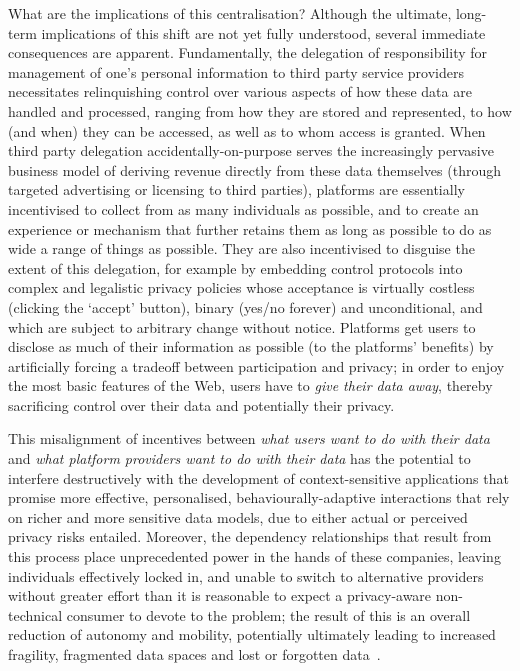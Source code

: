 \documentclass[graybox]{svmult}
\begin{document}
What are the implications of this centralisation?  Although the ultimate, long-term implications of this shift are not yet fully understood, several immediate consequences are apparent. Fundamentally, the delegation of responsibility for management of one's personal information to third party service providers necessitates relinquishing control over various aspects of how these data are handled and processed, ranging from how they are stored and represented, to how (and when) they can be accessed, as well as to whom access is granted.  When third party delegation accidentally-on-purpose serves the increasingly pervasive business model of deriving revenue directly from these data themselves (through targeted advertising or licensing to third parties), platforms are essentially incentivised to collect from as many individuals as possible, and to create an experience or mechanism that further retains them as long as possible to do as wide a range of things as possible. They are also incentivised to disguise the extent of this delegation, for example by embedding control protocols into complex and legalistic privacy policies whose acceptance is virtually costless (clicking the `accept' button), binary (yes/no forever) and unconditional, and which are subject to arbitrary change without notice. Platforms get users to disclose as much of their information as possible (to the platforms' benefits) by artificially forcing a tradeoff between participation and privacy; in order to enjoy the most basic features of the Web, users have to \emph{give their data away}, thereby sacrificing control over their data and potentially their privacy.

This misalignment of incentives between \emph{what users want to do with their data} and \emph{what platform providers want to do with their data} has the potential to interfere destructively with the development of context-sensitive applications that promise more effective, personalised, behaviourally-adaptive interactions that rely on richer and more sensitive data models, due to either actual or perceived privacy risks entailed.  Moreover, the dependency relationships that result from this process place unprecedented power in the hands of these companies, leaving individuals effectively locked in, and unable to switch to alternative providers without greater effort than it is reasonable to expect a privacy-aware non-technical consumer to devote to the problem; the result of this is an overall reduction of autonomy and mobility, potentially ultimately leading to increased fragility, fragmented data spaces and lost or forgotten data~\cite{whittaker2001character, odom2012technology}.
\end{document}
